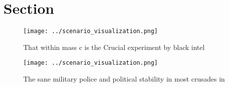\documentclass[a4paper]{article}
\begin{document}
\section{Section}

\begin{figure}
\centering
\texttt{[image: ../scenario\_visualization.png]}
\caption{That within mass c is the Crucial experiment by black intel
}
\end{figure}
 
\begin{figure}
\centering
\texttt{[image: ../scenario\_visualization.png]}
\caption{The sane military police and political stability in most crusades in 
}
\end{figure}
 
\end{document}

